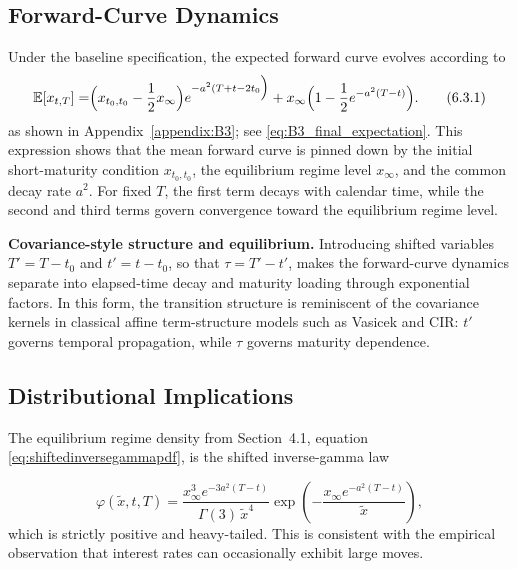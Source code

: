 \documentclass[12pt]{article}
\theoremstyle{statementstyle}
\begin{document}
\subsection{Forward-Curve Dynamics}
\label{subsec:forward-curve-dynamics}

Under the baseline specification, the expected forward curve evolves according to
\begin{equation}
\mathbb{E}[x_{t,T}]
=
\Bigr(x_{t_{0},t_{0}}-\frac{1}{2}x_{\infty}\Bigl)e^{-a^{2}(T+t-2t_{0}\Big)}
+
x_{\infty}\Bigr(1
-
\frac{1}{2}e^{-a^{2}(T-t)}\Bigl).
\tag{6.3.1}\label{eq:forward-curve-dynamics}
\end{equation}
as shown in Appendix~\ref{appendix:B3}; see \eqref{eq:B3_final_expectation}. This expression shows that the mean forward curve is pinned down by the initial short-maturity condition \(x_{t_{0},t_{0}}\), the equilibrium regime level \(x_{\infty}\), and the common decay rate \(a^{2}\). For fixed \(T\), the first term decays with calendar time, while the second and third terms govern convergence toward the equilibrium regime level.

\medskip
\noindent\textbf{Covariance-style structure and equilibrium.}
Introducing shifted variables \(T' = T - t_0\) and \(t' = t - t_0\), so that
\(\tau = T' - t'\), makes the forward-curve dynamics separate into elapsed-time
decay and maturity loading through exponential factors. In this form, the
transition structure is reminiscent of the covariance kernels in classical
affine term-structure models such as Vasicek and CIR: \(t'\) governs temporal
propagation, while \(\tau\) governs maturity dependence.


\subsection{Distributional Implications}
\label{subsec:distributional}

The equilibrium regime density from Section~4.1, equation \eqref{eq:shiftedinversegammapdf}, is the shifted inverse-gamma law

\begin{equation}
\varphi(\widetilde{x},t,T)
=
\frac{x_{\infty}^{3}e^{-3a^{2}(T-t)}}{\Gamma(3)\,\widetilde{x}^{4}}
\exp\!\left(
-\frac{x_{\infty}e^{-a^{2}(T-t)}}{\widetilde{x}}
\right),
\tag{6.4.1}\label{eq:long-time-limit-density-interpretation}
\end{equation}
which is strictly positive and heavy-tailed. This is consistent with
the empirical observation that interest rates can occasionally exhibit
large moves.
\end{document}
